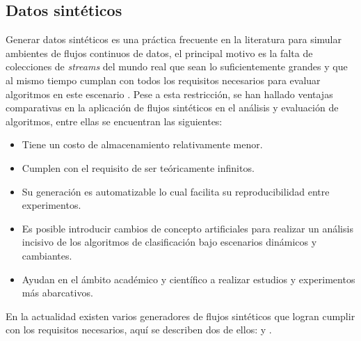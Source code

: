 \subsection{Datos sintéticos}
\label{stream_syn}

Generar datos sintéticos es una práctica frecuente en la literatura para simular
ambientes de flujos continuos de datos, el principal motivo es la falta de
colecciones de \textit{streams} del mundo real que sean lo suficientemente
grandes y que al mismo tiempo cumplan con todos los requisitos necesarios para
evaluar algoritmos en este escenario \cite{kirkby_improving_2007}. Pese a esta
restricción, se han hallado ventajas comparativas en la aplicación de flujos
sintéticos en el análisis y evaluación de algoritmos, entre ellas se encuentran
las siguientes:

\begin{itemize}

	\item Tiene un costo de almacenamiento relativamente menor.

	\item Cumplen con el requisito de ser teóricamente infinitos.

	\item Su generación es automatizable lo cual facilita su reproducibilidad
	      entre experimentos.

	\item Es posible introducir cambios de concepto artificiales para realizar un
	      análisis incisivo de los algoritmos de clasificación bajo escenarios
	      dinámicos y cambiantes.

	\item Ayudan en el ámbito académico y científico a realizar estudios y
	      experimentos más abarcativos.

\end{itemize}

En la actualidad existen varios generadores de flujos sintéticos que logran
cumplir con los requisitos necesarios, aquí se describen dos de ellos:
 y .

